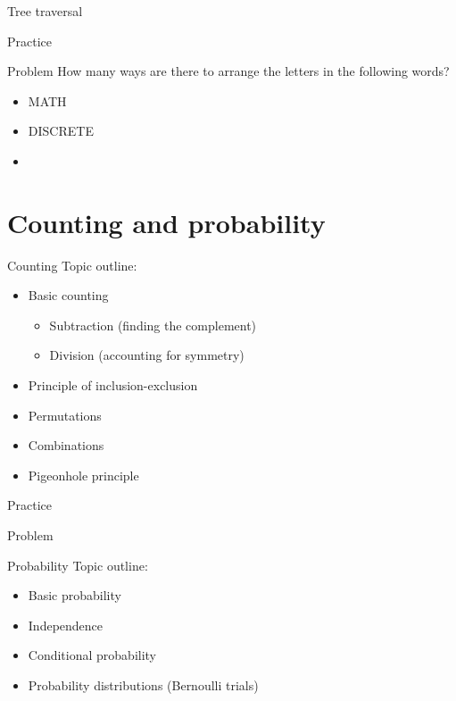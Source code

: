 \documentclass[dvipsnames,t,aspectratio=169]{beamer}
\begin{document}
\begin{frame}{Tree traversal}
	
\end{frame}

\begin{frame}{Practice}
	\begin{block}{Problem}
	How many ways are there to arrange the letters in the following words?
	\begin{itemize}
		\item MATH
		\item DISCRETE
		\item 
	\end{itemize}
	\end{block}
\end{frame}

\section{Counting and probability}

\begin{frame}{Counting}
	Topic outline:
	\begin{itemize}
		\item Basic counting
		\begin{itemize}
			\item Subtraction (finding the complement)
			\item Division (accounting for symmetry)
		\end{itemize}
		\item Principle of inclusion-exclusion
		\item Permutations
		\item Combinations
		\item Pigeonhole principle
	\end{itemize}
\end{frame}

\begin{frame}{Practice}
\begin{block}{Problem}

\end{block}
\end{frame}

\begin{frame}{Probability}
	Topic outline:
	\begin{itemize}
		\item Basic probability
		\item Independence
		\item Conditional probability
		\item Probability distributions (Bernoulli trials)
	\end{itemize}
\end{frame}
\end{document}
